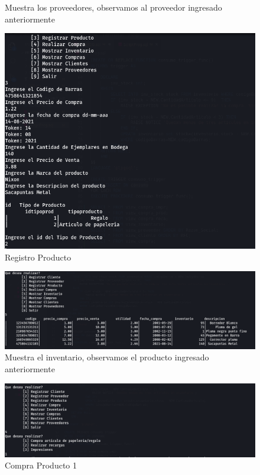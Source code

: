 \documentclass[letter,12pt]{article}
\begin{document}
\begin{center}
\begin{figure}[H]
\caption{Muestra los proveedores, observamos al proveedor ingresado anteriormente}
\end{figure}
\begin{figure}[H]
\includegraphics[scale=.6]{func3.png}
\caption{Registro Producto}
\end{figure}
\begin{figure}[H]
\includegraphics[scale=.40]{func3-1.png}
\caption{Muestra el inventario, observamos el producto ingresado anteriormente}
\end{figure}
\begin{figure}[H]
\includegraphics[scale=.45]{func4-1.png}
\caption{Compra Producto 1}
\end{figure}

\end{center}
\end{document}
